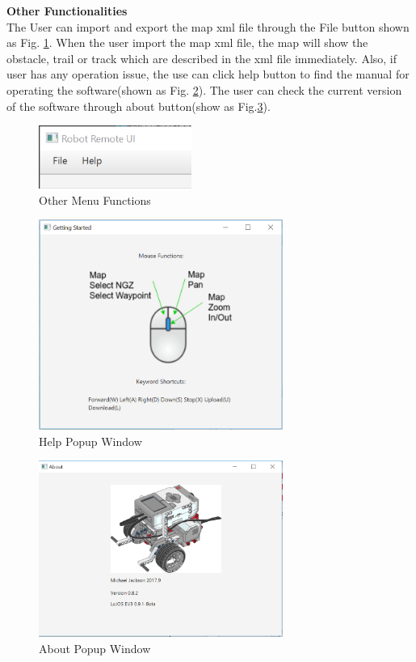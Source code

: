 \textbf{Other Functionalities}\\
The User can import and export the map xml file through the File button shown as Fig. \ref{fig:other topmenu}. When the user import the map xml file, the map will show the obstacle, trail or track which are described in the xml file immediately. Also, if user has any operation issue, the use can click help button to find the manual for operating the software(shown as Fig. \ref{fig:other_help}). The user can check the current version of the software through about button(show as Fig.\ref{fig:other_about}).

\begin{figure}[H]
	\centering
	\includegraphics[width=50mm]{other.png}  
	\caption{Other Menu Functions}
	\label{fig:other topmenu}                
\end{figure}

\begin{figure}[H]
	\centering
	\includegraphics[width=80mm]{Help.png}  
	\caption{Help Popup Window}
	\label{fig:other_help}                
\end{figure}

\begin{figure}[H]
	\centering
	\includegraphics[width=80mm]{About.png}  
	\caption{About Popup Window}
	\label{fig:other_about}
\end{figure}
